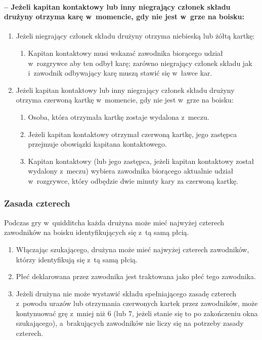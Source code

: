 \documentclass[12pt]{article}
\begin{document}
\paragraph{-- Jeżeli kapitan kontaktowy lub inny niegrający członek
	składu drużyny otrzyma karę w~momencie, gdy nie jest w~grze na boisku:}

\begin{enumerate}
	\item
	      Jeżeli niegrający członek składu drużyny otrzyma niebieską lub żółtą
	      kartkę:

	      \begin{enumerate}
		      \item
		            Kapitan kontaktowy musi wskazać zawodnika biorącego udział w~rozgrywce aby ten odbył karę; zarówno niegrający członek składu jak
		            i~zawodnik odbywający karę muszą stawić się w~ławce kar.
	      \end{enumerate}
	\item
	      Jeżeli kapitan kontaktowy lub inny niegrający członek składu drużyny
	      otrzyma czerwoną kartkę w~momencie, gdy nie jest w~grze na boisku:

	      \begin{enumerate}
		      \item
		            Osoba, która otrzymała kartkę zostaje wydalona z~meczu.
		      \item
		            Jeżeli kapitan kontaktowy otrzymał czerwoną kartkę, jego zastępca
		            przejmuje obowiązki kapitana kontaktowego.
		      \item
		            Kapitan kontaktowy (lub jego zastępca, jeżeli kapitan kontaktowy
		            został wydalony z~meczu) wybiera zawodnika biorącego aktualnie
		            udział w~rozgrywce, który odbędzie dwie minuty kary za czerwoną
		            kartkę.
	      \end{enumerate}
\end{enumerate}

\subsubsection{Zasada czterech}

Podczas gry w~quidditcha każda drużyna może mieć najwyżej czterech
zawodników na boisku identyfikujących się z~tą samą płcią.

\begin{enumerate}
	\item
	      Włączając szukającego, drużyna może mieć najwyżej czterech zawodników,
	      którzy identyfikują się z~tą samą płcią.
	\item
	      Płeć deklarowana przez zawodnika jest traktowana jako płeć tego
	      zawodnika.
	\item
	      Jeżeli drużyna nie może wystawić składu spełniającego zasadę czterech
	      z~powodu urazów lub otrzymania czerwonych kartek przez zawodników,
	      może kontynuować grę z~mniej niż 6 (lub 7, jeżeli stanie się to po
	      zakończeniu okna szukającego), a~brakujących zawodników nie liczy się
	      na potrzeby zasady czterech.
\end{enumerate}
\end{document}
